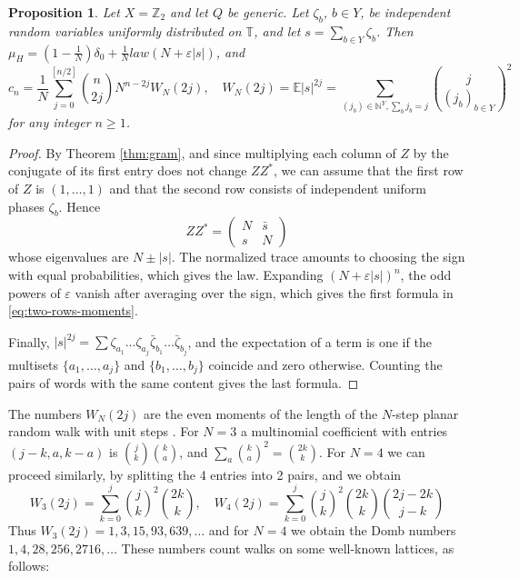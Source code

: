 \documentclass[11pt,reqno]{amsart}
\newtheorem{prop}[thm]{Proposition}
\theoremstyle{definition}
\numberwithin{equation}{section}
\begin{document}
\begin{prop}\label{prop:two-rows}
Let $X=\mathbb Z_2$ and let $Q$ be generic. Let $\zeta_b$, $b\in Y$, be independent random variables uniformly distributed on $\mathbb T$, and let $s=\sum_{b\in Y}\zeta_b$. Then $\mu_H=(1-\frac1N)\delta_0+\frac1N law(N+\varepsilon|s|)$, and
\begin{equation}\label{eq:two-rows-moments}
c_n=\frac1N\sum_{j=0}^{[n/2]}\binom n{2j}N^{n-2j}W_N(2j),
\quad
W_N(2j)=\mathbb E|s|^{2j}=\sum_{(j_b)\in\mathbb N^Y,\sum_b j_b=j}\binom j{(j_b)_{b\in Y}}^2
\end{equation}
for any integer $n\geq1$.
\end{prop}
\begin{proof}
By Theorem \ref{thm:gram}, and since multiplying each column of $Z$ by the conjugate of its first entry does not change $ZZ^*$, we can assume that the first row of $Z$ is $(1,\ldots,1)$ and that the second row consists of independent uniform phases $\zeta_b$. Hence
$$ZZ^*=\begin{pmatrix}N&\bar s\\s&N\end{pmatrix}$$
whose eigenvalues are $N \pm |s|$. The normalized trace amounts to choosing the sign with equal probabilities, which gives the law. Expanding $(N+\varepsilon|s|)^n$, the odd powers of $\varepsilon$ vanish after averaging over the sign, which gives the first formula in \eqref{eq:two-rows-moments}.

Finally, $|s|^{2j}=\sum \zeta_{a_1}\ldots\zeta_{a_j}\bar\zeta_{b_1}\ldots\bar\zeta_{b_j}$, and the expectation of a term is one if the multisets $\{a_1,\ldots,a_j\}$ and $\{b_1,\ldots,b_j\}$ coincide and zero otherwise. Counting the pairs of words with the same content gives the last formula.
\end{proof}

The numbers $W_N(2j)$ are the even moments of the length of the $N$-step planar random walk with unit steps \cite{BSWZ12}. For $N=3$ a multinomial coefficient with entries $(j-k,a,k-a)$ is $\binom jk\binom ka$, and $\sum_a\binom ka^2=\binom{2k}k$. For $N=4$ we can proceed similarly, by splitting the 4 entries into 2 pairs, and we obtain
$$W_3(2j)=\sum_{k=0}^j\binom jk^2\binom{2k}k,\quad
W_4(2j)=\sum_{k=0}^j\binom jk^2\binom{2k}k\binom{2j-2k}{j-k}$$
Thus $W_3(2j)=1,3,15,93,639,\ldots$ and for $N=4$ we obtain the Domb numbers $1,4,28,256,2716,\ldots$ These numbers count walks on some well-known lattices, as follows:
\end{document}
